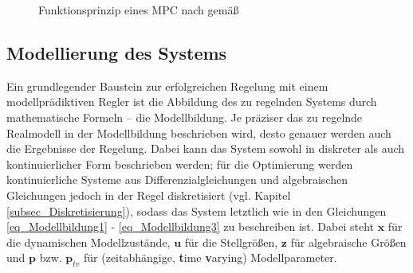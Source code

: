 \begin{figure}[h!]
    \centering
    \setlength{\fboxsep}{1pt}
    \setlength{\fboxrule}{1pt}
\caption[Funktionsprinzip eines MPC]{Funktionsprinzip eines MPC nach \cite[S.3]{Schwenzer} gemäß \cite{Richalet}}
    \label{fig_MPCVerhalten}
\end{figure}

\subsection{Modellierung des Systems} \label{subsec_Modellbildung}
Ein grundlegender Baustein zur erfolgreichen Regelung mit einem modellprädiktiven Regler ist die Abbildung des zu regelnden Systems durch mathematische Formeln – die Modellbildung.
Je präziser das zu regelnde Realmodell in der Modellbildung beschrieben wird, desto genauer werden auch die Ergebnisse der Regelung.
Dabei kann das System sowohl in diskreter als auch kontinuierlicher Form beschrieben werden; für die Optimierung werden kontinuierliche Systeme aus Differenzialgleichungen und algebraischen Gleichungen jedoch in der Regel diskretisiert (vgl. Kapitel \ref{subsec_Diskretisierung}), sodass das System letztlich wie in den Gleichungen \ref{eq_Modellbildung1} - \ref{eq_Modellbildung3} zu beschreiben ist.
Dabei steht $\boldsymbol{x}$ für die dynamischen Modellzustände, $\boldsymbol{u}$ für die Stellgrößen, $\boldsymbol{z}$ für algebraische Größen und $\boldsymbol{p}$ bzw.
$\boldsymbol{p}_{tv}$ für (zeitabhängige, \textbf{t}ime \textbf{v}arying) Modellparameter. \cite[S.3]{Schwenzer}\cite{Dompc1}

